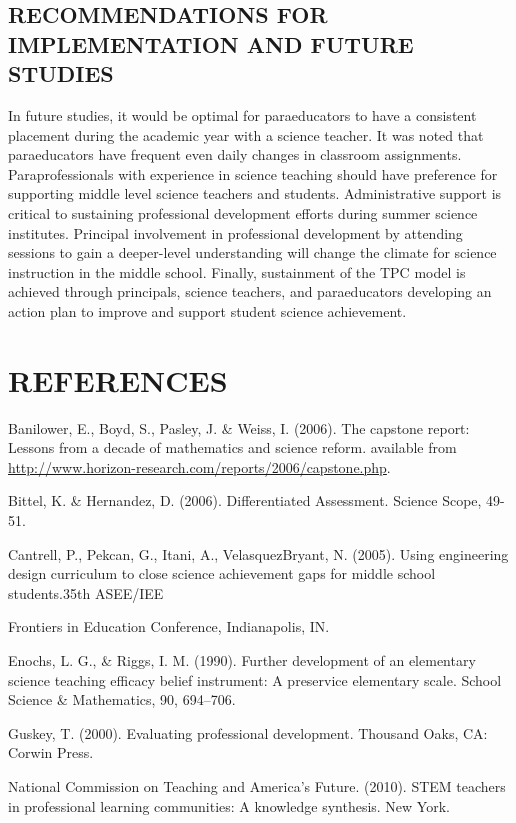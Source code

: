 \documentclass[11.5pt]{sig-alternate} %
\begin{document}
\begin{large}
\section*{RECOMMENDATIONS FOR IMPLEMENTATION AND FUTURE STUDIES}

In future studies, it would be optimal for paraeducators to have a consistent placement during the academic year with a science teacher. It was noted that paraeducators have frequent even daily changes in classroom assignments. Paraprofessionals with experience in science teaching should have preference for supporting middle level science teachers and students. Administrative support is critical to sustaining professional development efforts during summer science institutes. Principal involvement in professional development by attending sessions to gain a deeper-level understanding will change the climate for science instruction in the middle school. Finally, sustainment of the TPC model is achieved through principals, science teachers, and paraeducators developing an action plan to improve and support student science achievement.

\end{large}
\clearpage
\section*{REFERENCES}\par 

\leftskip 0.25in
\parindent -0.25in 
Banilower, E., Boyd, S., Pasley, J. \& Weiss, I. (2006). The capstone report: Lessons from a decade of mathematics and science reform. available from \url{http://www.horizon-research.com/reports/2006/capstone.php}.

Bittel, K. \& Hernandez, D. (2006). Differentiated Assessment. Science Scope, 49-51.

Cantrell, P., Pekcan, G., Itani, A., VelasquezBryant, N. (2005). Using engineering design curriculum to close science achievement gaps for middle school students.35th ASEE/IEE

Frontiers in Education Conference, Indianapolis, IN.

Enochs, L. G., \& Riggs, I. M. (1990). Further development of an elementary science teaching efficacy belief instrument: A preservice elementary scale. School Science \& Mathematics, 90, 694–706.

Guskey, T. (2000). Evaluating professional development. Thousand Oaks, CA: Corwin Press.

National Commission on Teaching and America’s Future. (2010). STEM teachers in professional learning communities: A knowledge synthesis. New York.
\end{document}

